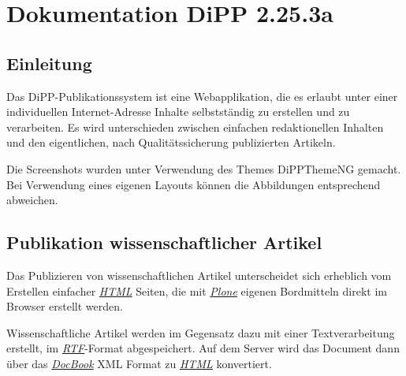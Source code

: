 \documentclass[a4paper,10pt,ngerman]{sphinxmanual}
\begin{document}
\part{Dokumentation DiPP 2.25.3a}
\label{index:dokumentation-dipp-version}

\chapter{Einleitung}
\label{einleitung:einleitung}\label{einleitung::doc}
Das DiPP-Publikationssystem ist eine Webapplikation, die es erlaubt unter einer
individuellen Internet-Adresse Inhalte selbstständig zu erstellen und zu
verarbeiten. Es wird unterschieden zwischen einfachen redaktionellen Inhalten
und den eigentlichen, nach Qualitätssicherung publizierten Artikeln.

Die Screenshots wurden unter Verwendung des Themes DiPPThemeNG gemacht. Bei
Verwendung eines eigenen Layouts können die Abbildungen entsprechend abweichen.


\chapter{Publikation wissenschaftlicher Artikel}
\label{publizieren:publikation-wissenschaftlicher-artikel}\label{publizieren::doc}
Das Publizieren von wissenschaftlichen Artikel unterscheidet sich erheblich vom
Erstellen einfacher {\hyperref[glossar:term-html]{\emph{HTML}}} Seiten, die mit {\hyperref[glossar:term-plone]{\emph{Plone}}} eigenen Bordmitteln
direkt im Browser erstellt werden.

Wissenschaftliche Artikel werden im Gegensatz dazu mit einer Textverarbeitung
erstellt, im {\hyperref[glossar:term-rtf]{\emph{RTF}}}-Format abgespeichert. Auf dem Server wird das Document
dann über das {\hyperref[glossar:term-docbook]{\emph{DocBook}}} XML Format zu {\hyperref[glossar:term-html]{\emph{HTML}}} konvertiert.
\end{document}
